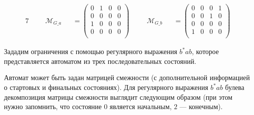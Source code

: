 \begin{alignat}{7}
   &  &  & \mathcal{M}_{G\_a} &  & = \begin{pmatrix}
                                       0 & 1 & 0 & 0 \\
                                       0 & 0 & 0 & 0 \\
                                       1 & 0 & 0 & 0 \\
                                       0 & 0 & 0 & 0 \\
                                     \end{pmatrix} \ \ \ \  &  & \mathcal{M}_{G\_b} &  & = \begin{pmatrix}
                                                                                             0 & 0 & 0 & 1 \\
                                                                                             0 & 0 & 1 & 0 \\
                                                                                             0 & 0 & 0 & 0 \\
                                                                                             1 & 0 & 0 & 0 \\
                                                                                           \end{pmatrix}
\end{alignat}

Зададим ограничения с помощью регулярного выражения $b^*ab$, которое представляется автоматом из трех последовательных состояний.

\begin{center}
\end{center}


Автомат может быть задан матрицей смежности (с дополнительной информацией о стартовых и финальных состояниях). Для регулярного выражения $b^*ab$ булева декомпозиция матрицы смежности выглядит следующим образом (при этом нужно запомнить, что
состояние $0$ является начальным, $2$ --- конечным).

